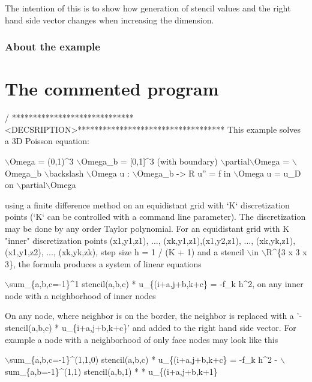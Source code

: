 The intention of this is to show how generation of stencil values and the right hand side vector changes when increasing the dimension.

\label{_Abouttheexample}%
\subsubsection*{About the example }

\label{_CommProg}%
 \section*{The commented program}


\begin{DoxyCode}
/ *****************************<DECSRIPTION>***********************************
This example solves a 3D Poisson equation:

    \(\backslash\)Omega = (0,1)^3
    \(\backslash\)Omega\_b = [0,1]^3   (with boundary)
    \(\backslash\)partial\(\backslash\)Omega = \(\backslash\)Omega\_b \(\backslash\)backslash \(\backslash\)Omega
    u : \(\backslash\)Omega\_b -> R
    u\textcolor{stringliteral}{''} = f in \(\backslash\)Omega
    u = u\_D on \(\backslash\)partial\(\backslash\)Omega

\textcolor{keyword}{using} a finite difference method on an equidistant grid with `K` discretization
points (`K` can be controlled with a command line parameter). The discretization
may be done by any order Taylor polynomial.
For an equidistant grid with K \textcolor{stringliteral}{"inner"} discretization points (x1,y1,z1), ...,
(xk,y1,z1),(x1,y2,z1), ..., (xk,yk,z1), (x1,y1,z2), ..., (xk,yk,zk), step size h
= 1 / (K + 1) and a stencil \(\backslash\)in \(\backslash\)R^\{3 x 3 x 3\}, the formula produces a system of
linear equations

\(\backslash\)sum\_\{a,b,c=-1\}^1 stencil(a,b,c) * u\_\{(i+a,j+b,k+c\} = -f\_k h^2,  on any inner
node with a neighborhood of inner nodes

On any node, where neighbor is on the border, the neighbor is replaced with a
\textcolor{stringliteral}{'-stencil(a,b,c) * u\_\{i+a,j+b,k+c\}'} and added to the right hand side vector.
For example a node with a neighborhood of only face nodes may look like this

\(\backslash\)sum\_\{a,b,c=-1\}^(1,1,0) stencil(a,b,c) * u\_\{(i+a,j+b,k+c\} = -f\_k h^2 -
\(\backslash\)sum\_\{a,b=-1\}^(1,1) stencil(a,b,1) * * u\_\{(i+a,j+b,k+1\}


\end{DoxyCode}
